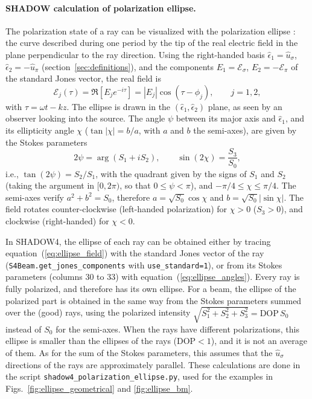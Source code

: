 \documentclass{iucr}
\begin{document}
\paragraph{SHADOW calculation of polarization ellipse.}
The polarization state of a ray can be visualized with the polarization ellipse \cite{Detlefs2012}: the curve described during one period by the tip of the real electric field in the plane perpendicular to the ray direction. Using the right-handed basis $\hat{\epsilon}_1=\hat{u}_\sigma$, $\hat{\epsilon}_2=-\hat{u}_\pi$ (section~\ref{sec:definitions}), and the components $E_1=\mathcal{E}_\sigma$, $E_2=-\mathcal{E}_\pi$ of the standard Jones vector, the real field is
\begin{equation}\label{eq:ellipse_field}
    \mathcal{E}_{j}(\tau)=\Re\left[E_j e^{-i\tau}\right]=|E_j|\cos(\tau-\phi_j), \qquad j=1,2,
\end{equation}
with $\tau=\omega t - k z$. The ellipse is drawn in the $(\hat{\epsilon}_1,\hat{\epsilon}_2)$ plane, as seen by an observer looking into the source. The angle $\psi$ between its major axis and $\hat{\epsilon}_1$, and its ellipticity angle $\chi$ ($\tan|\chi|=b/a$, with $a$ and $b$ the semi-axes), are given by the Stokes parameters \cite{Detlefs2012}
\begin{equation}\label{eq:ellipse_angles}
    2\psi=\arg(S_1+iS_2), \qquad \sin(2\chi)=\frac{S_3}{S_0},
\end{equation}
i.e., $\tan(2\psi)=S_2/S_1$, with the quadrant given by the signs of $S_1$ and $S_2$ (taking the argument in $[0,2\pi)$, so that $0\le\psi<\pi$), and $-\pi/4\le\chi\le\pi/4$. The semi-axes verify $a^2+b^2=S_0$, therefore $a=\sqrt{S_0}\cos\chi$ and $b=\sqrt{S_0}|\sin\chi|$. The field rotates counter-clockwise (left-handed polarization) for $\chi>0$ ($S_3>0$), and clockwise (right-handed) for $\chi<0$.

In SHADOW4, the ellipse of each ray can be obtained either by tracing equation~(\ref{eq:ellipse_field}) with the standard Jones vector of the ray ({\tt S4Beam.get\_jones\_components} with {\tt use\_standard=1}), or from its Stokes parameters (columns 30 to 33) with equation~(\ref{eq:ellipse_angles}). Every ray is fully polarized, and therefore has its own ellipse. For a beam, the ellipse of the polarized part is obtained in the same way from the Stokes parameters summed over the (good) rays, using the polarized intensity $\sqrt{S_1^2+S_2^2+S_3^2}=\mathrm{DOP}\,S_0$ instead of $S_0$ for the semi-axes. When the rays have different polarizations, this ellipse is smaller than the ellipses of the rays (DOP$<1$), and it is not an average of them. As for the sum of the Stokes parameters, this assumes that the $\hat{u}_\sigma$ directions of the rays are approximately parallel.
These calculations are done in the script {\tt shadow4\_polarization\_ellipse.py}, used for the examples in Figs.~\ref{fig:ellipse_geometrical} and \ref{fig:ellipse_bm}.
\end{document}

